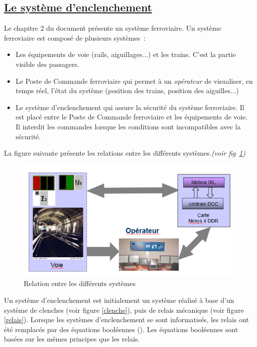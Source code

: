 \subsection{\underline{Le système d'enclenchement}}
\label{sec:log_ixl}

Le chapitre 2 du document \cite{sun2015} présente un système
ferroviaire. Un système ferroviaire est compos\'e de plusieurs systèmes~:
\begin{itemize}
  \item Les \'equipements de voie (rails, aiguillages...) et les
    trains. C'est la partie visible des passagers. 
  \item Le Poste de Commande ferroviaire qui permet à un \emph{op\'erateur} de
    visualiser, en temps r\'eel, l'\'etat du système (position des trains,
    position des aiguilles...)
  \item Le système d'enclenchement qui assure la s\'ecurit\'e du système
    ferroviaire. Il est plac\'e entre le Poste de Commande ferroviaire
    et les \'equipements de voie. Il interdit les commandes lorsque les
    conditions sont incompatibles avec la s\'ecurit\'e. 
\end{itemize}

La figure suivante pr\'esente les relations entre les diff\'erents
systèmes.\emph{(voir fig~\ref{fig3})}

\begin{figure}[h]
\centering
\includegraphics[scale=0.50]{sys_ferro.png}
\caption{Relation entre les différents systèmes}
\label{fig3}
\end{figure}

Un système d'enclenchement est initialement un système réalisé à base
d'un système de clenches (voir figure \ref{clenche}), puis de relais
mécanique (voir figure \ref{relais}). Lorsque les systèmes
d'enclenchement se sont 
informatisés, les relais ont été remplacés par des équations
booléennes (\cite{nyct2016}). Les équations booléennes sont basées sur
les mêmes principes que les relais.

